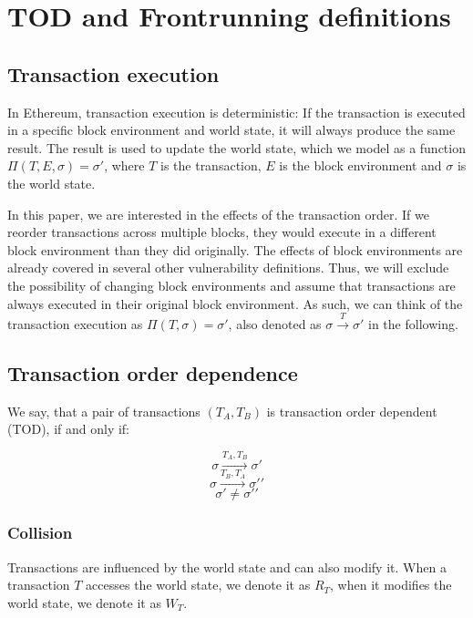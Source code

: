 \documentclass[draft,final]{vutinfth} %
\begin{document}
\chapter{TOD and Frontrunning definitions}

\section{Transaction execution}

In Ethereum, transaction execution is deterministic: If the transaction is executed in a specific block environment and world state, it will always produce the same result. The result is used to update the world state, which we model as a function $\Pi(T, E, \sigma) = \sigma\prime$, where $T$ is the transaction, $E$ is the block environment and $\sigma$ is the world state.

In this paper, we are interested in the effects of the transaction order. If we reorder transactions across multiple blocks, they would execute in a different block environment than they did originally. The effects of block environments are already covered in several other vulnerability definitions. Thus, we will exclude the possibility of changing block environments and assume that transactions are always executed in their original block environment. As such, we can think of the transaction execution as $\Pi(T, \sigma) = \sigma\prime$, also denoted as $\sigma \xrightarrow{T} \sigma\prime$ in the following.


\section{Transaction order dependence}

We say, that a pair of transactions $(T_A, T_B)$ is transaction order dependent (TOD), if and only if:

$$\sigma \xrightarrow{T_A, T_B} \sigma \prime$$
$$\sigma \xrightarrow{T_B, T_A} \sigma \prime \prime$$
$$\sigma \prime \neq \sigma \prime \prime$$


\subsection{Collision}

Transactions are influenced by the world state and can also modify it. When a transaction $T$ accesses the world state, we denote it as $R_T$, when it modifies the world state, we denote it as $W_T$.
\end{document}
